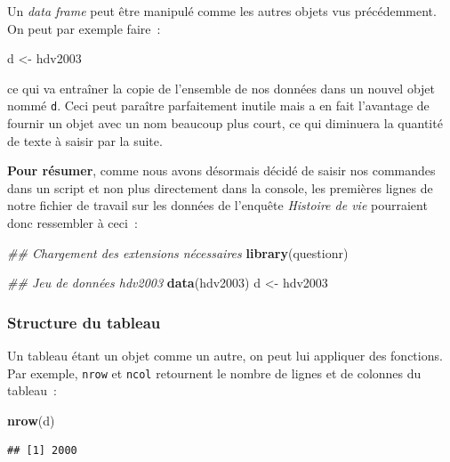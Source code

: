 \documentclass[12pt,]{book}
\newenvironment{Shaded}{\begin{snugshade}}{\end{snugshade}}
\newcommand{\CommentTok}[1]{\textcolor[rgb]{0.56,0.35,0.01}{\textit{#1}}}
\newcommand{\KeywordTok}[1]{\textcolor[rgb]{0.13,0.29,0.53}{\textbf{#1}}}
\newcommand{\NormalTok}[1]{#1}
\newcommand{\StringTok}[1]{\textcolor[rgb]{0.31,0.60,0.02}{#1}}
\begin{document}
Un \emph{data frame} peut être manipulé comme les autres objets vus précédemment. On peut par exemple faire~:

\begin{Shaded}
\begin{Highlighting}[]
\NormalTok{d <-}\StringTok{ }\NormalTok{hdv2003}
\end{Highlighting}
\end{Shaded}

ce qui va entraîner la copie de l'ensemble de nos données dans un nouvel objet nommé \texttt{d}. Ceci peut paraître parfaitement inutile mais a en fait l'avantage de fournir un objet avec un nom beaucoup plus court, ce qui diminuera la quantité de texte à saisir par la suite.

\textbf{Pour résumer}, comme nous avons désormais décidé de saisir nos commandes dans un script et non plus directement dans la console, les premières lignes de notre fichier de travail sur les données de l'enquête \emph{Histoire de vie} pourraient donc ressembler à ceci~:

\begin{Shaded}
\begin{Highlighting}[]
\CommentTok{## Chargement des extensions nécessaires}
\KeywordTok{library}\NormalTok{(questionr)}

\CommentTok{## Jeu de données hdv2003}
\KeywordTok{data}\NormalTok{(hdv2003)}
\NormalTok{d <-}\StringTok{ }\NormalTok{hdv2003}
\end{Highlighting}
\end{Shaded}

\hypertarget{structure-du-tableau}{%
\subsubsection{Structure du tableau}\label{structure-du-tableau}}

Un tableau étant un objet comme un autre, on peut lui appliquer des fonctions. Par exemple, \texttt{nrow} et \texttt{ncol} retournent le nombre de lignes et de colonnes du tableau~:

\begin{Shaded}
\begin{Highlighting}[]
\KeywordTok{nrow}\NormalTok{(d)}
\end{Highlighting}
\end{Shaded}

\begin{verbatim}
## [1] 2000
\end{verbatim}
\end{document}
